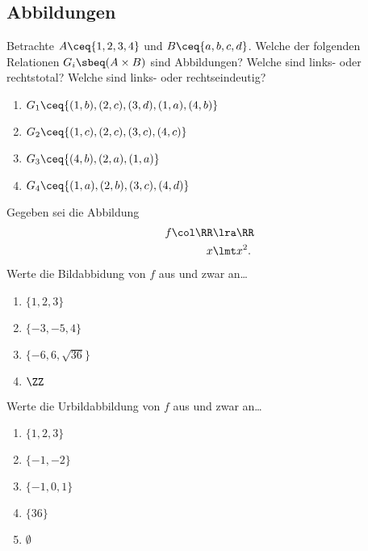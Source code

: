 \subsection*{Abbildungen}


\begin{aufg}

  Betrachte $A\ceq\{1,2,3,4\}$ und $B\ceq\{a,b,c,d\}$. Welche der folgenden
  Relationen $G_{i}\sbeq (A\times B)$ sind Abbildungen? Welche sind links- oder
  rechtstotal? Welche sind links- oder rechtseindeutig?
  \begin{enumerate}
    \item $G_{1}\ceq \{ (1,b) , (2,c), (3,d), (1,a), (4,b) \}$
    \item $G_{2}\ceq \{ (1,c) , (2,c), (3,c), (4,c) \}$
    \item $G_{3}\ceq \{ (4,b) , (2,a), (1,a) \}$
    \item $G_{4}\ceq \{ (1,a) , (2,b), (3,c), (4,d) \}$
  \end{enumerate}
  
\end{aufg}


\begin{aufg}
  Gegeben sei die Abbildung
  \begin{align*}
    f\col\RR&\lra\RR \\
    x&\lmt x^{2}.
  \end{align*}
  Werte die Bildabbidung von $f$ aus und zwar an\dots
  \begin{enumerate}
    \item $\{ 1,2,3 \}$
    \item $\{ -3,-5,4 \}$
    \item $\{ -6, 6, \sqrt{36} \}$
    \item $\ZZ$
  \end{enumerate}
  Werte die Urbildabbildung von $f$ aus und zwar an\dots
  \begin{enumerate}
    \item $\{ 1,2,3 \}$
    \item $\{ -1,-2 \}$
    \item $\{ -1,0,1 \}$
    \item $\{ 36 \}$
    \item $\emptyset$
  \end{enumerate}
\end{aufg}


